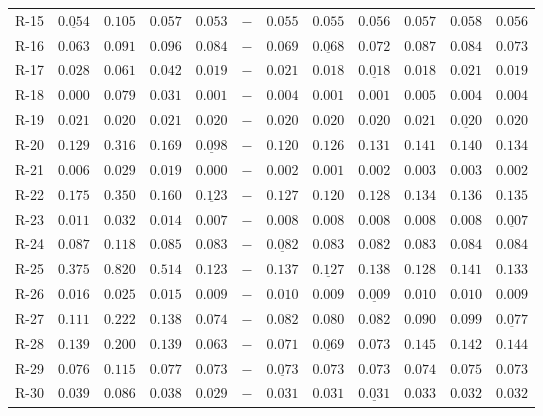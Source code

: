{\begin{longtable}[t]{p{1cm}|p{1cm}|p{1cm}|p{1cm}|p{1cm}|p{1cm}|cccccc}
R-15 & $\underline{0.054}$ & $0.105$ & $0.057$ & $\bm{0.053}$ & $-$ & $0.055$ & $0.055$ & $0.056$ & $0.057$ & $0.058$ & $0.056$ \\
R-16 & $\bm{0.063}$ & $0.091$ & $0.096$ & $0.084$ & $-$ & $0.069$ & $\underline{0.068}$ & $0.072$ & $0.087$ & $0.084$ & $0.073$ \\
R-17 & $0.028$ & $0.061$ & $0.042$ & $0.019$ & $-$ & $0.021$ & $\bm{0.018}$ & $\underline{0.018}$ & $0.018$ & $0.021$ & $0.019$ \\
R-18 & $\bm{0.000}$ & $0.079$ & $0.031$ & $0.001$ & $-$ & $0.004$ & $0.001$ & $0.001$ & $0.005$ & $0.004$ & $0.004$ \\
R-19 & $0.021$ & $0.020$ & $0.021$ & $0.020$ & $-$ & $0.020$ & $\bm{0.020}$ & $0.020$ & $0.021$ & $\underline{0.020}$ & $0.020$ \\
R-20 & $0.129$ & $0.316$ & $0.169$ & $\underline{0.098}$ & $-$ & $0.120$ & $0.126$ & $0.131$ & $0.141$ & $0.140$ & $0.134$ \\
R-21 & $0.006$ & $0.029$ & $0.019$ & $\bm{0.000}$ & $-$ & $0.002$ & $0.001$ & $0.002$ & $0.003$ & $0.003$ & $0.002$ \\
R-22 & $0.175$ & $0.350$ & $0.160$ & $\underline{0.123}$ & $-$ & $0.127$ & $\bm{0.120}$ & $0.128$ & $0.134$ & $0.136$ & $0.135$ \\
R-23 & $0.011$ & $0.032$ & $0.014$ & $\bm{0.007}$ & $-$ & $0.008$ & $0.008$ & $0.008$ & $0.008$ & $0.008$ & $\underline{0.007}$ \\
R-24 & $0.087$ & $0.118$ & $0.085$ & $0.083$ & $-$ & $\underline{0.082}$ & $0.083$ & $\bm{0.082}$ & $0.083$ & $0.084$ & $0.084$ \\
R-25 & $0.375$ & $0.820$ & $0.514$ & $\bm{0.123}$ & $-$ & $0.137$ & $\underline{0.127}$ & $0.138$ & $0.128$ & $0.141$ & $0.133$ \\
R-26 & $0.016$ & $0.025$ & $0.015$ & $\bm{0.009}$ & $-$ & $0.010$ & $0.009$ & $\underline{0.009}$ & $0.010$ & $0.010$ & $0.009$ \\
R-27 & $0.111$ & $0.222$ & $0.138$ & $\bm{0.074}$ & $-$ & $0.082$ & $0.080$ & $0.082$ & $0.090$ & $0.099$ & $\underline{0.077}$ \\
R-28 & $0.139$ & $0.200$ & $0.139$ & $\bm{0.063}$ & $-$ & $0.071$ & $\underline{0.069}$ & $0.073$ & $0.145$ & $0.142$ & $0.144$ \\
R-29 & $0.076$ & $0.115$ & $0.077$ & $0.073$ & $-$ & $\underline{0.073}$ & $0.073$ & $0.073$ & $0.074$ & $0.075$ & $\bm{0.073}$ \\
R-30 & $0.039$ & $0.086$ & $0.038$ & $\bm{0.029}$ & $-$ & $0.031$ & $0.031$ & $\underline{0.031}$ & $0.033$ & $0.032$ & $0.032$ \\

\end{longtable}}
